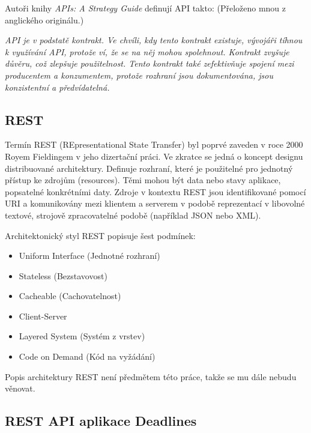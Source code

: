 \documentclass[thesis=B,czech]{FITthesis}[2012/06/26]
\begin{document}
			Autoři knihy \textit{APIs: A Strategy Guide} \cite{apis-a-strategy-guide} definují API takto: (Přeloženo mnou z anglického originálu.)
			
			\textit{API je v podstatě kontrakt. Ve chvíli, kdy tento kontrakt existuje, vývojáři tíhnou k využívání API, protože ví, že se na něj mohou spolehnout. Kontrakt zvyšuje důvěru, což zlepšuje použitelnost. Tento kontrakt také zefektivňuje spojení mezi producentem a konzumentem, protože rozhraní jsou dokumentována, jsou konzistentní a předvídatelná.} 
	
		\subsection{REST}
			Termín REST (REpresentational State Transfer) byl poprvé zaveden v roce 2000 Royem Fieldingem v jeho dizertační práci. \cite{rest-dissertation} Ve zkratce se jedná o koncept designu distribuované architektury. Definuje rozhraní, které je použitelné pro jednotný přístup ke zdrojům (resources). Těmi mohou být data nebo stavy aplikace, popsatelné konkrétními daty.
			Zdroje v kontextu REST jsou identifikované pomocí URI a komunikovány mezi klientem a serverem v podobě reprezentací v libovolné textové, strojově zpracovatelné podobě (například JSON nebo XML). \cite{rest-youtube}
			
			Architektonický styl REST popisuje šest podmínek:
			\begin{itemize}
				\item Uniform Interface (Jednotné rozhraní)
				\item Stateless (Bezstavovost)
				\item Cacheable (Cachovatelnost)
				\item Client-Server
				\item Layered System (Systém z vrstev)
				\item Code on Demand (Kód na vyžádání)
			\end{itemize}
			Popis architektury REST není předmětem této práce, takže se mu dále nebudu věnovat.
			
		\subsection{REST API aplikace Deadlines}
			
\end{document}
